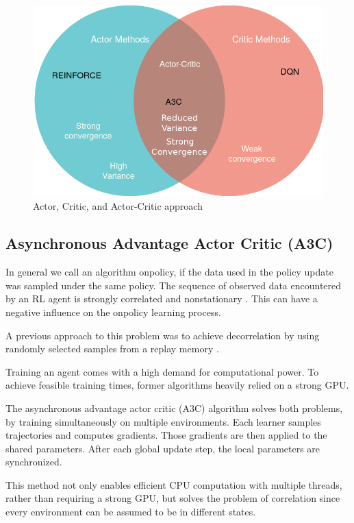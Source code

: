 \begin{figure}
\includegraphics[scale=0.5]{bilder/actorcritic1.png}
\caption{Actor, Critic, and Actor-Critic approach}
\end{figure}

\pagebreak



\subsection{Asynchronous Advantage Actor Critic (A3C)}

In general we call an algorithm onpolicy, if the data used in the policy update was sampled under the same policy. The sequence of observed data encountered by an RL agent is strongly correlated and nonstationary \citep{A3C}. This can have a negative influence on the onpolicy learning process.

A previous approach to this problem was to achieve decorrelation by using randomly selected samples from a replay memory \citep{mnih2015atari}.

Training an agent comes with a high demand for computational power. To achieve feasible training times, former algorithms heavily relied on a strong GPU.

The asynchronous advantage actor critic (A3C) algorithm solves both problems, by training simultaneously on multiple environments.
Each learner samples trajectories and computes gradients. Those gradients are then applied to the shared parameters. 
After each global update step, the local parameters are synchronized.

This method not only enables efficient CPU computation with multiple threads, rather than requiring a strong GPU, but solves the problem of correlation since every environment can be assumed to be in different states.


